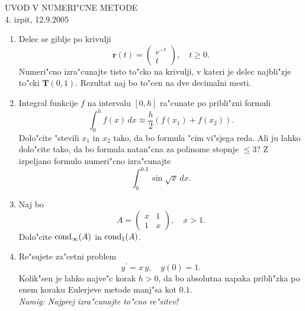 

\begin{center}
  {\large UVOD V NUMERI"CNE METODE\\
    4. izpit, 12.9.2005\\
    }
\end{center}
\vspace{1cm}

\begin{enumerate}
  
  \item Delec se giblje po krivulji
    \begin{equation*}
    	\mathbf{r}(t)=
    	\begin{pmatrix}
    	  e^{-t}\\
    	  t
    	\end{pmatrix}, \quad t\geq 0.
    \end{equation*}
    Numeri"cno izra"cunajte tisto to"cko na krivulji, v
    kateri je delec najbli"zje to"cki $\mathbf{T}(0,1)$.
    Rezultat naj bo to"cen na dve decimalni mesti.
    
  \item Integral funkcije $f$ na intervalu $[0,h]$
    ra"cunate po pribli"zni formuli
    \begin{equation*}
      \int_0^h f(x)\,dx\approx \frac{h}{2}
      \left(f(x_1)+f(x_2)\right).
    \end{equation*}
    Dolo"cite "stevili $x_1$ in $x_2$ tako, da bo
    formula "cim vi"sjega reda. Ali ju lahko dolo"cite
    tako, da bo formula natan"cna za polinome stopnje
    $\leq 3$? Z izpeljano formulo numeri"cno
    izra"cunajte 
    \begin{equation*}
      \int_0^{0.3}\sin{\sqrt{x}}\,dx.
    \end{equation*}
  
  \item Naj bo 
    \begin{equation*}
      A=
      \begin{pmatrix}
        x & 1\\
        1 & x
      \end{pmatrix},\quad x>1.
    \end{equation*}
    Dolo"cite ${\rm cond}_\infty(A)$ in
    ${\rm cond}_1(A)$.
    
  \item Re"sujete za"cetni problem 
    \begin{equation*}
      y^{'}=x\,y,\quad y(0)=1.
    \end{equation*}
    Kolik"sen je lahko najve"c korak $h>0$, da bo 
    absolutna napaka pribli"zka po enem koraku Eulerjeve metode
    manj"sa kot $0.1$.\\
    {\sl Namig: Najprej izra"cunajte to"cno re"sitev!}
\end{enumerate}
 
